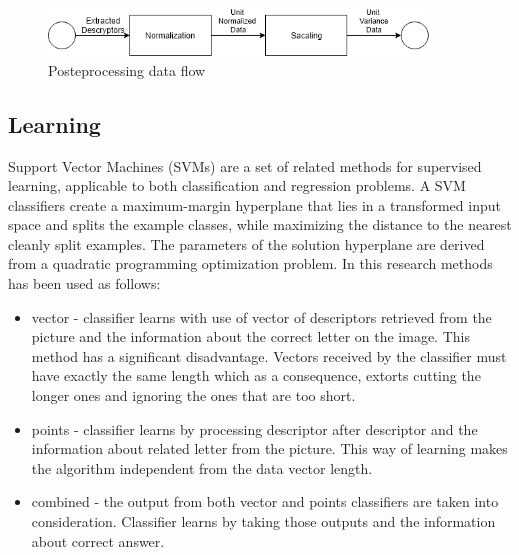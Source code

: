 \documentclass[11pt,a4paper]{article}
\begin{document}
\begin{figure}[H]
	\centering
	\includegraphics[width=0.9\textwidth]{Postprocessing.png}
	\caption{Posteprocessing data flow}
	\label{fig:Posteprocessing}
\end{figure}

\subsection{Learning}

Support Vector Machines (SVMs) are a set of related methods for supervised learning, applicable to both classification and regression problems. A SVM classifiers create a maximum-margin hyperplane that lies in a transformed input space and splits the example classes, while maximizing the distance to the nearest cleanly split examples. The parameters of the solution hyperplane are derived from a quadratic programming optimization problem\cite{SVM1}. In this research methods has been used as follows:

\begin{itemize}
	\item vector - classifier learns with use of vector of descriptors retrieved from the picture and the information about the correct letter on the image. 
This method has a significant disadvantage. Vectors received by the classifier must have exactly the same length which as a consequence, extorts cutting the longer ones and ignoring the ones that are too short.
	
	\item points - classifier learns by processing descriptor after descriptor and the information about related letter from the picture. This way of learning makes the algorithm independent from the data vector length.
	
	\item combined - the output from both vector and points classifiers are taken into consideration. Classifier learns by taking those outputs and the information about correct answer.
	
\end{itemize}

\end{document}
